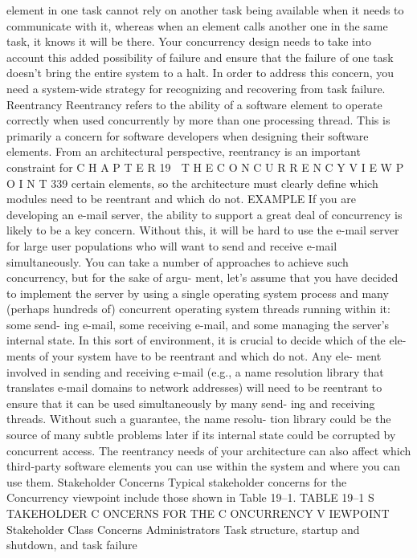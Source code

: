 element in one task cannot rely on another task being available when it
needs to communicate with it, whereas when an element calls another one
in the same task, it knows it will be there. Your concurrency design needs
to take into account this added possibility of failure and ensure that the
failure of one task doesn’t bring the entire system to a halt. In order to
address this concern, you need a system-wide strategy for recognizing and
recovering from task failure.
Reentrancy
Reentrancy refers to the ability of a software element to operate correctly
when used concurrently by more than one processing thread. This is primarily
a concern for software developers when designing their software elements.
From an architectural perspective, reentrancy is an important constraint for
C H A P T E R 19  T H E C O N C U R R E N C Y V I E W P O I N T
 339
certain elements, so the architecture must clearly define which modules need
to be reentrant and which do not.
EXAMPLE If you are developing an e-mail server, the ability to support
a great deal of concurrency is likely to be a key concern. Without this, it
will be hard to use the e-mail server for large user populations who will
want to send and receive e-mail simultaneously. You can take a number
of approaches to achieve such concurrency, but for the sake of argu-
ment, let’s assume that you have decided to implement the server by
using a single operating system process and many (perhaps hundreds
of) concurrent operating system threads running within it: some send-
ing e-mail, some receiving e-mail, and some managing the server’s
internal state.
In this sort of environment, it is crucial to decide which of the ele-
ments of your system have to be reentrant and which do not. Any ele-
ment involved in sending and receiving e-mail (e.g., a name resolution
library that translates e-mail domains to network addresses) will need to
be reentrant to ensure that it can be used simultaneously by many send-
ing and receiving threads. Without such a guarantee, the name resolu-
tion library could be the source of many subtle problems later if its
internal state could be corrupted by concurrent access.
The reentrancy needs of your architecture can also affect which third-party
software elements you can use within the system and where you can use them.
Stakeholder Concerns
Typical stakeholder concerns for the Concurrency viewpoint include those
shown in Table 19–1.
TABLE 19–1 S TAKEHOLDER C ONCERNS FOR THE C ONCURRENCY V IEWPOINT
Stakeholder Class
 Concerns
Administrators
 Task structure, startup and shutdown, and task failure

